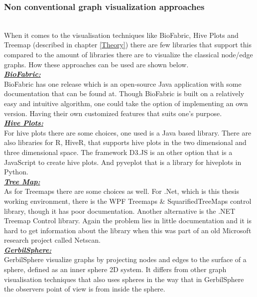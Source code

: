 \documentclass[a4paper,11pt]{kth-mag}
\begin{document}
\begin{appendices}
\subsubsection{Non conventional graph visualization approaches}\\
When it comes to the visualisation techniques like BioFabric, Hive Plots and Treemap (described in chapter \ref{Theory}) there are few libraries that support this compared to the amount of libraries there are
 to visualize the classical node/edge graphs. How these approaches can be used are shown below.\\
\newline
\textbf{\textit{\underline{BioFabric:}}}\\
\newline
BioFabric has one release which is an open-source Java application with some documentation that can be found at\cite{website:biofabricdoc}. Though BioFabric is built on a relatively easy and intuitive algorithm, one could
 take the option of implementing an own version. Having their own customized features that suits one's purpose.\\
\newline
\textbf{\textit{\underline{Hive Plots:}}}\\
\newline
For hive plots there are some choices, one used is a Java based library\cite{website:JHive}. There are also libraries for R\cite{website:R}, HiveR\cite{website:HiveR}, that supports hive plots in the two dimensional and three dimensional space.
The framework D3.JS\cite{website:D3JS} is an other option that is a JavaScript to create hive plots. And pyveplot\cite{website:pyveplot} that is a library for hiveplots in Python\cite{website:python}.\\
\newline
\textbf{\textit{\underline{Tree Map:}}}\\
\newline
As for Treemaps there are some choices as well. For .Net, which is this thesis working environment, there is the WPF Treemaps \& SquarifiedTreeMaps control library\cite{website:WPFTreeMaps}, though it has poor documentation.
 Another alternative is the .NET Treemap Control library\cite{website:devxTreeMap}. Again the problem lies in little documentation and it is hard to get information about the library when this was part of an old Microsoft
 research project called Netscan.\\
\newline
\textbf{\textit{\underline{GerbilSphere:}}}\\
\newline
GerbilSphere visualize graphs by projecting nodes and edges to the surface of a sphere, defined as an inner sphere 2D system. It differs from other graph visualisation techniques that also uses spheres
in the way that in GerbilSphere the observers point of view is from inside the sphere.


\end{appendices}
\end{document}
